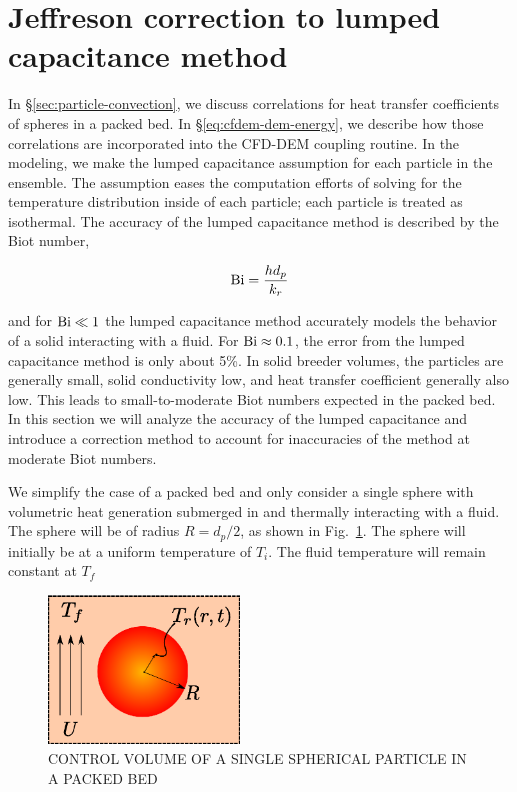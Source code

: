 \section{Jeffreson correction to lumped capacitance method}\label{sec:ht-jeffreson-correction}
In \S\ref{sec:particle-convection}, we discuss correlations for heat transfer coefficients of spheres in a packed bed. In \S\ref{eq:cfdem-dem-energy}, we describe how those correlations are incorporated into the CFD-DEM coupling routine. In the modeling, we make the lumped capacitance assumption for each particle in the ensemble. The assumption eases the computation efforts of solving for the temperature distribution inside of each particle; each particle is treated as isothermal. The accuracy of the lumped capacitance method is described by the Biot number,

\begin{equation}
     \mathrm{Bi} = \frac{hd_p}{k_r}
\end{equation} 

and for $\mathrm{Bi} \ll 1$ the lumped capacitance method accurately models the behavior of a solid interacting with a fluid. For $\mathrm{Bi} \approx 0.1$, the error from the lumped capacitance method is only about 5\%. In solid breeder volumes, the particles are generally small, solid conductivity low, and heat transfer coefficient generally also low. This leads to small-to-moderate Biot numbers expected in the packed bed. In this section we will analyze the accuracy of the lumped capacitance and introduce a correction method to account for inaccuracies of the method at moderate Biot numbers.

We simplify the case of a packed bed and only consider a single sphere with volumetric heat generation submerged in and thermally interacting with a fluid. The sphere will be of radius $R=d_p/2$, as shown in Fig.~\ref{fig:ParticleControlVolume}. The sphere will initially be at a uniform temperature of $T_i$. The fluid temperature will remain constant at $T_f$

\begin{figure}[ht]
	\centering
		\includegraphics[width=2in]{chapters/figures/ParticleControlVolume}
	\caption[Control volume of single spherical particle in a packed bed]{CONTROL VOLUME OF A SINGLE SPHERICAL PARTICLE IN A PACKED BED}
	\label{fig:ParticleControlVolume}
\end{figure}


